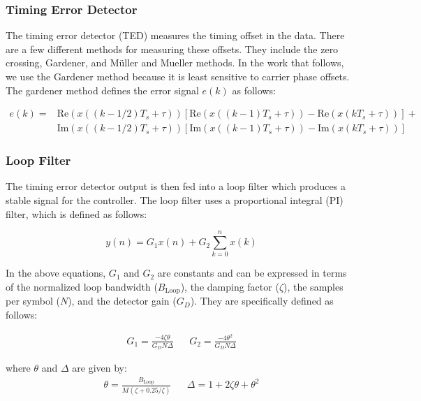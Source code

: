 \documentclass[conference,onecolumn]{IEEEtran}
\begin{document}
\subsubsection{Timing Error Detector}

\noindent The timing error detector (TED) measures the timing offset in the data. There are a few different methods for measuring these offsets. They include the zero crossing, Gardener, and  M\"{u}ller and Mueller methods. In the work that follows, we use the Gardener method because it is least sensitive to carrier phase offsets. The gardener method defines the error signal $e(k)$ as follows:

\begin{equation}
\begin{split}
	e(k) =& \text{Re}(x((k-1/2)T_s+\tau))\left[\text{Re}(x((k-1)T_s + \tau)) - \text{Re}(x(kT_s + \tau))\right] + \\
	&\text{Im}(x((k-1/2)T_s+\tau))\left[\text{Im}(x((k-1)T_s+\tau)) -\text{Im}(x(kT_s+\tau))\right]
\end{split}
\end{equation}

\subsubsection{Loop Filter}

\noindent The timing error detector output is then fed into a loop filter which produces a stable signal for the controller. The loop filter uses a proportional integral (PI) filter, which is defined as follows:

\begin{equation}
	y(n) = G_1x(n) + G_2\sum_{k=0}^{n}{x(k)}
\end{equation}

\noindent In the above equations, $G_1$ and $G_2$ are constants and can be expressed in terms of the normalized loop bandwidth ($B_{\text{Loop}}$), the damping factor ($\zeta$), the samples per symbol ($N$), and the detector gain ($G_D$). They are specifically defined as follows:

\begin{align}
	G_1 = \frac{-4\zeta\theta}{G_DN\Delta} && G_2 = \frac{-4\theta^2}{G_DN\Delta}
	\label{eq::loop_filter}
\end{align}

\noindent where $\theta$ and $\Delta$ are given by:
\begin{align}
	\theta = \frac{B_{\text{Loop}}}{M(\zeta + 0.25/\zeta)} && \Delta = 1 + 2\zeta\theta + \theta^2
\end{align}
\end{document}
